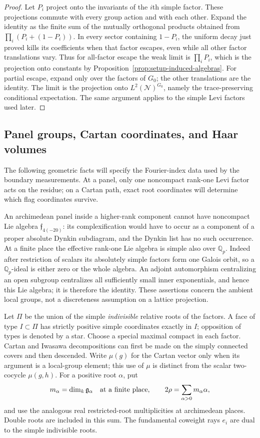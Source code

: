 \begin{proof}
Let $P_i$ project onto the invariants of the $i$th simple factor.
These projections commute with every group action and with each
other.  Expand the identity as the finite sum of the mutually
orthogonal products obtained from $\prod_i(P_i+(1-P_i))$.
In every sector containing $1-P_i$, the uniform decay just proved
kills its coefficients when that factor escapes, even while all
other factor translations vary.  Thus for all-factor escape the
weak limit is $\prod_iP_i$, which is the projection onto constants
by Proposition~\ref{prop:setup-induced-algebras}.  For partial escape,
expand only over the factors of $G_0$; the other translations are the
identity.  The limit is the projection onto
$L^2(\mathcal N)^{G_0}$, namely the trace-preserving conditional
expectation.  The same argument applies to the simple Levi factors
used later.
\end{proof}


\subsection{Panel groups, Cartan coordinates, and Haar volumes}

The following geometric facts will specify the Fourier-index data used
by the boundary measurements. At a panel, only one noncompact rank-one
Levi factor acts on the residue; on a Cartan path, exact root coordinates
will determine which flag coordinates survive.

An archimedean panel inside a higher-rank component cannot have
noncompact Lie algebra $\mathfrak f_{4(-20)}$: its complexification
would have to occur as a component of a proper absolute Dynkin
subdiagram, and the Dynkin list has no such occurrence.  At a finite
place the effective rank-one Lie algebra is simple also over
$\mathbb Q_p$.  Indeed after restriction of scalars its absolutely
simple factors form one Galois orbit, so a $\mathbb Q_p$-ideal is
either zero or the whole algebra.  An adjoint automorphism centralizing
an open subgroup centralizes all sufficiently small inner
exponentials, and hence this Lie algebra; it is therefore the
identity.  These assertions concern the ambient local groups, not a
discreteness assumption on a lattice projection.

Let $\Pi$ be the union of the simple \emph{indivisible} relative
roots of the factors.  A face of type $I\subset\Pi$ has strictly
positive simple coordinates exactly in $I$; opposition of types
is denoted by a star.  Choose a special maximal compact in each
factor.  Cartan and Iwasawa decompositions can first be made on the
simply connected covers and then descended.  Write $\mu(g)$ for the
Cartan vector only when its argument is a local-group element; this
use of $\mu$ is distinct from the scalar two-cocycle
$\mu(g,h)$.  For a positive root $\alpha$, put
\[
 m_\alpha=\dim_{k}\mathfrak g_\alpha
     \quad\hbox{at a finite place},
 \qquad
 2\rho=\sum_{\alpha>0}m_\alpha\alpha,
\]
and use the analogous real restricted-root multiplicities at
archimedean places.  Double roots are included in this sum.  The
fundamental coweight rays $e_i$ are dual to the simple indivisible
roots.

